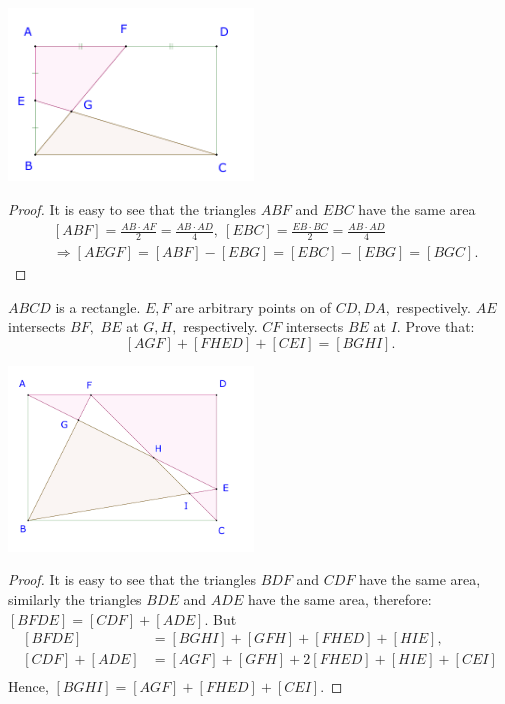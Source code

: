 \documentclass{article}
\begin{document}
\begin{center}
    \includegraphics[width=6.5cm]{./svg/pdf/23-24-s3-i-p14.pdf}
\end{center}

\begin{proof}
    It is easy to see that the triangles $ABF$ and $EBC$ have the same area 
    \[
        \begin{aligned}
            &[ABF] = \frac{AB \cdot AF}{2} = \frac{AB \cdot AD}{4},\ [EBC] = \frac{EB \cdot BC}{2} = \frac{AB \cdot AD}{4}\\
            &\Rightarrow [AEGF] = [ABF] - [EBG] = [EBC] - [EBG] = [BGC].
        \end{aligned}
    \]
\end{proof}

\newpage

\begin{example*}[Example 14]
    $ABCD$ is a rectangle. $E, F$ are arbitrary points on of $CD, DA,$ respectively.
    $AE$ intersects $BF,$ $BE$ at $G, H,$ respectively. $CF$ intersects $BE$ at $I.$ Prove that:
    \[
        [AGF] + [FHED] + [CEI] = [BGHI].
    \]
\end{example*}

\begin{center}
    \includegraphics[width=6.5cm]{./svg/pdf/23-24-s3-i-p15.pdf}
\end{center}

\begin{proof}
    It is easy to see that the triangles $BDF$ and $CDF$ have the same area, similarly the triangles $BDE$ and $ADE$ have the same area, therefore:
    $[BFDE] = [CDF] + [ADE].$ But
    \[
        \begin{aligned}
            [BFDE] &= [BGHI] + [GFH] + [FHED] + [HIE],\\
            [CDF] + [ADE] &= [AGF] + [GFH] + 2 [FHED] + [HIE] + [CEI]\\
        \end{aligned}
    \]
    Hence, $[BGHI] = [AGF] + [FHED] + [CEI].$
\end{proof}
\end{document}
